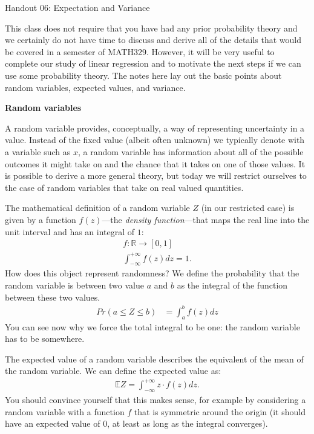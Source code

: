 \documentclass[12pt,hidelinks]{article}
\numberwithin{equation}{section}
\begin{document}
{\LARGE Handout 06: Expectation and Variance}

\vspace*{18pt}

This class does not require that you have had any prior probability theory
and we certainly do not have time to discuss and derive all of the details
that would be covered in a semester of MATH329. However, it will be very
useful to complete our study of linear regression and to motivate the next
steps if we can use some probability theory. The notes here lay out the basic
points about random variables, expected values, and variance.

\textbf{Random variables}

A random variable provides, conceptually, a way of representing uncertainty
in a value. Instead of the fixed value (albeit often unknown) we typically
denote with a variable such as $x$, a random variable has information about
all of the possible outcomes it might take on and the chance that it takes
on one of those values. It is possible to derive a more general theory, but
today we will restrict ourselves to the case of random variables that take on
real valued quantities.

The mathematical definition of a random variable $Z$ (in our restricted case)
is given by a function $f(z)$---the \textit{density function}---that maps the
real line into the unit interval and has an integral of $1$:
\begin{align}
f: \mathbb{R} \rightarrow [0, 1] \\
\int_{-\infty}^{+\infty} f(z) dz = 1.
\end{align}
How does this object represent randomness? We define the probability that the
random variable is between two value $a$ and $b$ as the integral of the function
between these two values.
\begin{align}
Pr(a \leq Z \leq b) &= \int_a^b f(z) dz
\end{align}
You can see now why we force the total integral to be one: the random variable
has to be somewhere.

The expected value of a random variable describes the equivalent of the mean
of the random variable. We can define the expected value as:
\begin{align}
\mathbb{E} Z = \int_{-\infty}^{+\infty} z\cdot f(z) dz.
\end{align}
You should convince yourself that this makes sense, for example by considering
a random variable with a function $f$ that is symmetric around the origin (it
should have an expected value of $0$, at least as long as the integral
converges).
\end{document}
